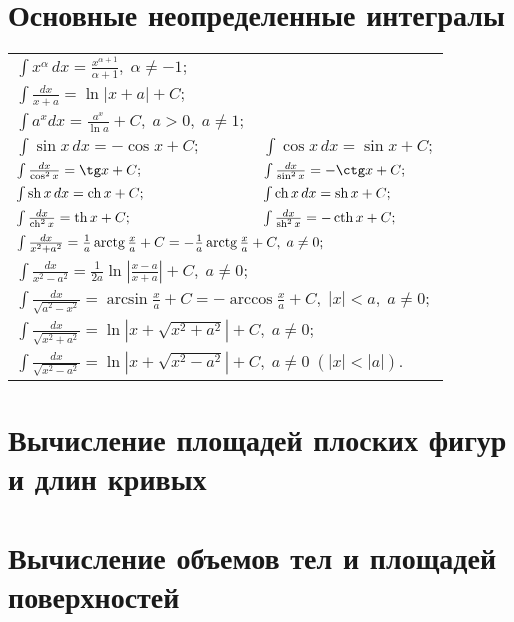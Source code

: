 \section{Основные неопределенные интегралы}
\noindent\begin{longtable}[l]{l l}
$\int x^\alpha \,dx = \frac{x^{\alpha+1}}{\alpha+1},\; \alpha\neq -1;$ & $ $ 
\\ $\int\frac{dx}{x+a} = \ln|x+a|+C;$ & $ $ 
\\ $\int a^x dx = \frac{a^x}{\ln a} + C, \; a>0,\; a\neq 1;$ & $ $ 
\\ $\int \sin x\,dx =-\cos x + C; $ 
& $\int \cos x \,dx = \sin x + C;$ 
\\ $\int \frac{dx}{\cos^2 x} = \tg x + C;$ 
& $\int \frac{dx}{\sin^2 x} = -\ctg x + C;$ 
\\ $\int \mathop{\rm sh}\nolimits x \,dx = \mathop{\rm ch}\nolimits x + C; $ 
& $\int \mathop{\rm ch}\nolimits x \,dx = \mathop{\rm sh}\nolimits x + C;$ 
\\ $\int \frac{dx}{\mathop{\rm ch}\nolimits^2 x} = \mathop{\rm th}\nolimits x + C; $ 
& $\int \frac{dx}{\mathop{\rm sh}\nolimits^2 x} = -\mathop{\rm cth}\nolimits x + C; $ 
\\ \multicolumn{2}{l}{$\int\frac{dx}{x^2+a^2} = \frac{1}{a}\mathop{\rm arctg}\nolimits\frac{x}{a} + C = -\frac{1}{a}\mathop{\rm arctg}\nolimits\frac{x}{a} + C,\; a\neq 0; $}
\\ \multicolumn{2}{l}{$\int\frac{dx}{x^2-a^2} = \frac{1}{2a}\ln\left|\frac{x-a}{x+a}\right| + C, \; a\neq 0 ;$ }
\\ \multicolumn{2}{l}{$\int\frac{dx}{\sqrt{a^2-x^2}} = \arcsin\frac{x}{a} + C=-\arccos\frac{x}{a} + C,\; |x|<a,\;a\neq 0;$}
\\ \multicolumn{2}{l}{$\int\frac{dx}{\sqrt{x^2+a^2}} = \ln|x+\sqrt{x^2+a^2}|+C,\; a\neq 0; $}
\\\multicolumn{2}{l}{$\int\frac{dx}{\sqrt{x^2-a^2}}= \ln|x+\sqrt{x^2-a^2}|+C,\; a\neq 0 \;(|x|<|a|). $}
\end{longtable}

\section{Вычисление площадей плоских фигур и длин кривых}



\section{Вычисление объемов тел и площадей поверхностей}

